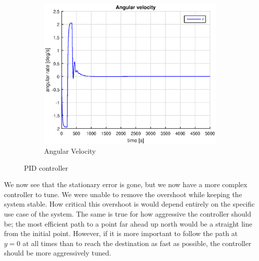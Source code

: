 \begin{figure}[h]
    \begin{subfigure}[b]{0.45\textwidth}
        \includegraphics[width=\textwidth]{plots/2_4_r_PID.eps}
        \caption{Angular Velocity}
        \label{fig:24_r_pid}
    \end{subfigure}
    \caption{PID controller}\label{fig:24_PID}
\end{figure}

We now see that the stationary error is gone, but we now have a more complex controller to tune. We were unable to remove the overshoot while keeping the system stable. How critical this overshoot is would depend entirely on the specific use case of the system. The same is true for how aggressive the controller should be; the most efficient path to a point far ahead up north would be a straight line from the initial point. However, if it is more important to follow the path at $y=0$ at all times than to reach the destination as fast as possible, the controller should be more aggressively tuned.